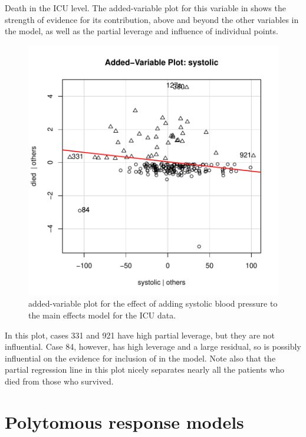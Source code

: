 \documentclass[11pt]{book}
\renewenvironment{knitrout}{\small\renewcommand{\baselinestretch}{.85}}{} %
\begin{document}
\begin{Example}[icu3]{Death in the ICU}
level.  The added-variable plot for this variable in 
shows the strength of evidence for its contribution, above and beyond the other variables
in the model, as well as the partial leverage and influence of individual points.
\begin{knitrout}
\color{fgcolor}\begin{kframe}
\begin{alltt}
 \hlstd{,} \hlstd{=}\hlstd{,} 
\end{alltt}
\end{kframe}\begin{figure}[!htbp]


\centerline{\includegraphics[width=.6\textwidth]{ch07/fig/icu3-avp2} }

\caption[added-variable plot for the effect of adding systolic blood pressure to the main effects model for the ICU data]{added-variable plot for the effect of adding systolic blood pressure to the main effects model for the ICU data.\label{fig:icu3-avp2}}
\end{figure}


\end{knitrout}
In this plot, cases 331 and 921 have high partial leverage, but they are not influential.
Case 84, however, has high leverage and a large residual, so is possibly influential on the
evidence for inclusion of  in the model.
Note also that the partial regression line in this plot nicely separates nearly all the patients who died
from those who survived.

\end{Example}

\section{Polytomous response models}\label{sec:logist-poly}
\end{document}
